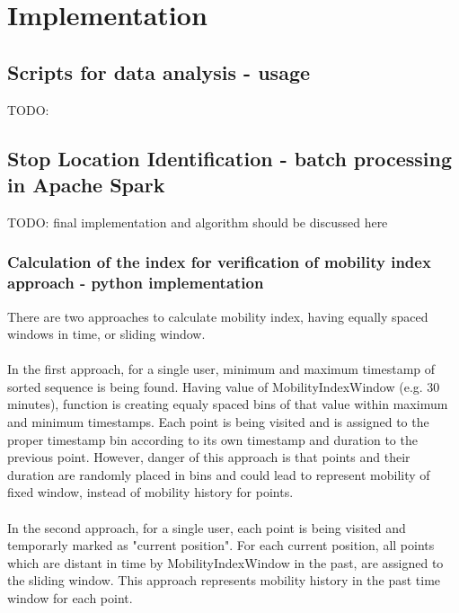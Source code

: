 \chapter{Implementation}
\label{cha:implementation}

\section{Scripts for data analysis - usage}

TODO: 

\section{Stop Location Identification - batch processing in Apache Spark}

TODO: final implementation and algorithm should be discussed here

\subsection{Calculation of the index for verification of mobility index approach - python implementation}

There are two approaches to calculate mobility index, having equally spaced windows in time, or sliding window.
\\\\
In the first approach, for a single user, minimum and maximum timestamp of sorted sequence is being found. Having value of MobilityIndexWindow (e.g. 30 minutes), function is creating equaly spaced bins of that value within maximum and minimum timestamps. Each point is being visited and is assigned to the proper timestamp bin according to its own timestamp and duration to the previous point. However, danger of this approach is that points and their duration are randomly placed in bins and could lead to represent mobility of fixed window, instead of mobility history for points.  
\\\\
In the second approach, for a single user, each point is being visited and temporarly marked as "current position". For each current position, all points which are distant in time by MobilityIndexWindow in the past, are assigned to the sliding window. This approach represents mobility history in the past time window for each point. 

